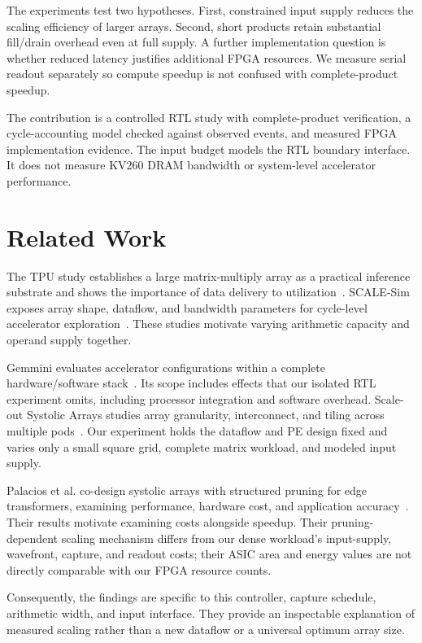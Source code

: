\documentclass[conference]{IEEEtran}
\begin{document}
The experiments test two hypotheses. First, constrained input supply reduces the scaling efficiency of larger arrays. Second, short products retain substantial fill/drain overhead even at full supply. A further implementation question is whether reduced latency justifies additional FPGA resources. We measure serial readout separately so compute speedup is not confused with complete-product speedup.

The contribution is a controlled RTL study with complete-product verification, a cycle-accounting model checked against observed events, and measured FPGA implementation evidence. The input budget models the RTL boundary interface. It does not measure KV260 DRAM bandwidth or system-level accelerator performance.

\section{Related Work}
The TPU study establishes a large matrix-multiply array as a practical inference substrate and shows the importance of data delivery to utilization~\cite{tpu}. SCALE-Sim exposes array shape, dataflow, and bandwidth parameters for cycle-level accelerator exploration~\cite{scale}. These studies motivate varying arithmetic capacity and operand supply together.

Gemmini evaluates accelerator configurations within a complete hardware/software stack~\cite{gemmini}. Its scope includes effects that our isolated RTL experiment omits, including processor integration and software overhead. Scale-out Systolic Arrays studies array granularity, interconnect, and tiling across multiple pods~\cite{sosa}. Our experiment holds the dataflow and PE design fixed and varies only a small square grid, complete matrix workload, and modeled input supply.

Palacios et al. co-design systolic arrays with structured pruning for edge transformers, examining performance, hardware cost, and application accuracy~\cite{sasp}. Their results motivate examining costs alongside speedup. Their pruning-dependent scaling mechanism differs from our dense workload's input-supply, wavefront, capture, and readout costs; their ASIC area and energy values are not directly comparable with our FPGA resource counts.

Consequently, the findings are specific to this controller, capture schedule, arithmetic width, and input interface. They provide an inspectable explanation of measured scaling rather than a new dataflow or a universal optimum array size.
\end{document}

